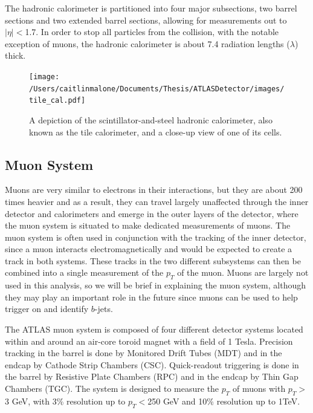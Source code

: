 The hadronic calorimeter is partitioned into four major subsections, two barrel sections and two extended barrel sections, allowing for measurements out to $|\eta|<$1.7.  In order to stop all particles from the collision, with the notable exception of muons, the hadronic calorimeter is about 7.4 radiation lengths ($\lambda$) thick.

\begin{figure}
	\texttt{[image: /Users/caitlinmalone/Documents/Thesis/ATLASDetector/images/tile\_cal.pdf]}
	\caption{A depiction of the scintillator-and-steel hadronic calorimeter, also known as the tile calorimeter, and a close-up view of one of its cells.	\label{fig:tile_cal}}
\end{figure}



\subsection{Muon System}
\label{sec:ms}
Muons are very similar to electrons in their interactions, but they are about 200 times heavier and as a result, they can travel largely unaffected through the inner detector and calorimeters and emerge in the outer layers of the detector, where the muon system is situated to make dedicated measurements of muons.  The muon system is often used in conjunction with the tracking of the inner detector, since a muon interacts electromagnetically and would be expected to create a track in both systems.  These tracks in the two different subsystems can then be combined into a single measurement of the $p_T$ of the muon.  Muons are largely not used in this analysis, so we will be brief in explaining the muon system, although they may play an important role in the future since muons can be used to help trigger on and identify $b$-jets.


The ATLAS muon system is composed of four different detector systems located within and around an air-core toroid magnet with a field of 1 Tesla.  Precision tracking in the barrel is done by Monitored Drift Tubes (MDT) and in the endcap by Cathode Strip Chambers (CSC).  Quick-readout triggering is done in the barrel by Resistive Plate Chambers (RPC) and in the endcap by Thin Gap Chambers (TGC).   The system is designed to measure the $p_T$ of muons with $p_T>$3 GeV, with 3\% resolution up to $p_T<$250 GeV and 10\% resolution up to 1TeV.  



